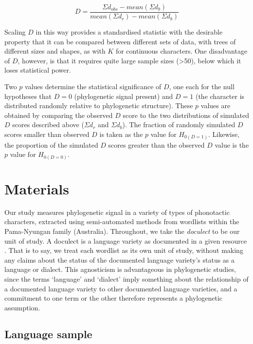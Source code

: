 \begin{equation}
D = \frac{\Sigma d_{obs} - mean\left( \Sigma d_{b} \right)}{mean\left( \Sigma d_{r} \right) - mean\left( \Sigma d_{b} \right)}
\end{equation}

Scaling \(D\) in this way provides a standardised statistic with the desirable property that it can be compared between different sets of data, with trees of different sizes and shapes, as with \(K\) for continuous characters. One disadvantage of \(D\), however, is that it requires quite large sample sizes (\textgreater{}50), below which it loses statistical power.

Two \(p\) values determine the statistical significance of \(D\), one each for the null hypotheses that \(D = 0\) (phylogenetic signal present) and \(D = 1\) (the character is distributed randomly relative to phylogenetic structure). These \(p\) values are obtained by comparing the observed \(D\) score to the two distributions of simulated \(D\) scores described above (\(\Sigma d_r\) and \(\Sigma d_b\)). The fraction of randomly simulated \(D\) scores smaller than observed \(D\) is taken as the \(p\) value for \(H_{0(D=1)}\). Likewise, the proportion of the simulated \(D\) scores greater than the observed \(D\) value is the \(p\) value for \(H_{0(D=0)}\).

\hypertarget{materials}{%
\section{Materials}\label{materials}}

Our study measures phylogenetic signal in a variety of types of phonotactic characters, extracted using semi-automated methods from wordlists within the Pama-Nyungan family (Australia). Throughout, we take the \emph{doculect} to be our unit of study. A doculect is a language variety as documented in a given resource \autocites{cysouw_towards_2007}{good_languoid_2013}. That is to say, we treat each wordlist as its own unit of study, without making any claims about the status of the documented language variety's status as a language or dialect. This agnosticism is advantageous in phylogenetic studies, since the terms `language' and `dialect' imply something about the relationship of a documented language variety to other documented language varieties, and a commitment to one term or the other therefore represents a phylogenetic assumption.

\hypertarget{sample}{%
\subsection{Language sample}\label{sample}}

